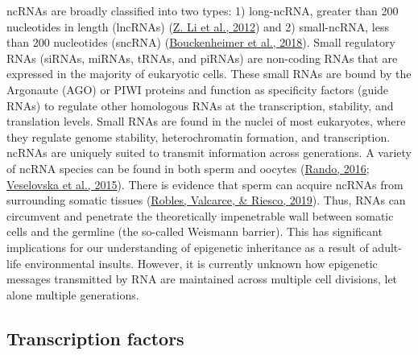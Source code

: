 \documentclass[12pt,twoside]{reedthesis}
\begin{document}
ncRNAs are broadly classified into two types: 1) long-ncRNA, greater
than 200 nucleotides in length (lncRNAs) (\protect\hyperlink{ref-li2012}{Z. Li et al., 2012}) and 2) small-ncRNA,
less than 200 nucleotides (sncRNA) (\protect\hyperlink{ref-bouckenheimer2018}{Bouckenheimer et al., 2018}). Small
regulatory RNAs (siRNAs, miRNAs, tRNAs, and piRNAs) are non-coding RNAs
that are expressed in the majority of eukaryotic cells. These small RNAs
are bound by the Argonaute (AGO) or PIWI proteins and function as
specificity factors (guide RNAs) to regulate other homologous RNAs at
the transcription, stability, and translation levels. Small RNAs are
found in the nuclei of most eukaryotes, where they regulate genome
stability, heterochromatin formation, and transcription. ncRNAs are
uniquely suited to transmit information across generations. A variety of
ncRNA species can be found in both sperm and oocytes (\protect\hyperlink{ref-rando2016}{Rando, 2016}; \protect\hyperlink{ref-veselovska2015}{Veselovska et al., 2015}). There is evidence that sperm can acquire ncRNAs from
surrounding somatic tissues (\protect\hyperlink{ref-robles2019}{Robles, Valcarce, \& Riesco, 2019}). Thus, RNAs can circumvent and
penetrate the theoretically impenetrable wall between somatic cells and
the germline (the so-called Weismann barrier). This has significant
implications for our understanding of epigenetic inheritance as a result
of adult-life environmental insults. However, it is currently unknown
how epigenetic messages transmitted by RNA are maintained across
multiple cell divisions, let alone multiple generations.

\hypertarget{transcription-factors}{%
\subsection{Transcription factors}\label{transcription-factors}}
\end{document}
